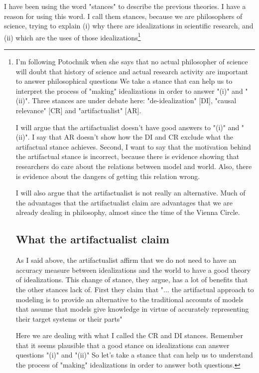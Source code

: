 I have been using the word "stances" to describe the previous theories.
I have a reason for using this word.
I call them stances, because we are philosophers of science, trying to explain (i) why there are idealizations in scientific research, and (ii) which are the uses of those idealizations\footnote{I'm following Potochnik when she says that no actual philosopher of science will doubt that history of science and actual research activity are important to answer philosophical questions %
We take a stance that can help us to interpret the process of "making" idealizations in order to answer "(i)" and "(ii)".
Three stances are under debate here: "de-idealization" [DI], "causal relevance" [CR] and "artifactualist" [AR].

I will argue that the artifactualist doesn't have good answers to "(i)" and "(ii)".
I say that AR doesn't show how the DI and CR exclude what the artifactual stance achieves.
Second, I want to say that the motivation behind the artifactual stance is incorrect, because there is evidence showing that researchers do care about the relations between model and world.
Also, there is evidence about the dangers of getting this relation wrong.

I will also argue that the artifactualist is not really an alternative.
Much of the advantages that the artifactualist claim are advantages that we are already dealing in philosophy, almost since the time of the Vienna Circle.


\section{What the artifactualist claim}

As I said above, the artifactualist affirm that we do not need to have an accuracy measure between idealizations and the world to have a good theory of idealizations.
This change of stance, they argue, has a lot of benefits that the other stances lack of.
First they claim that "$\ldots$ the artifactual approach to modeling is to provide an alternative to the traditional accounts of models that assume that models give knowledge in virtue of accurately representing their target systems or their parts"%

Here we are dealing with what I called the CR and DI stances.
Remember that it seems plausible that a good stance on idealizations can answer questions "(i)" and "(ii)"
So let's take a stance that can help us to understand the process of "making" idealizations in order to answer both questions.


}
